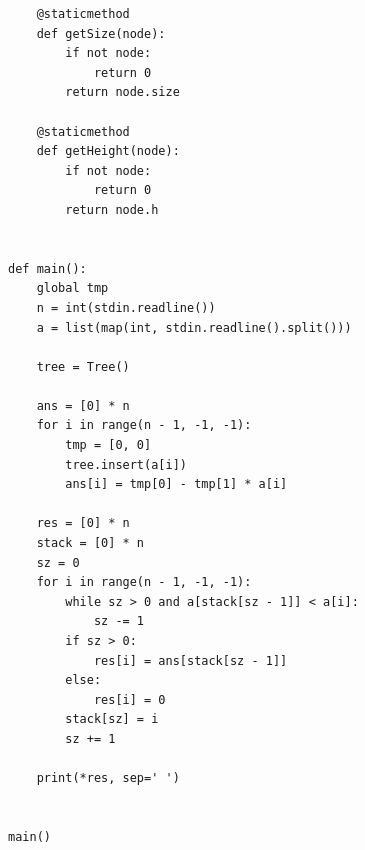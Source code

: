 \begin{latin}
\begin{lstlisting}
    @staticmethod
    def getSize(node):
        if not node:
            return 0
        return node.size

    @staticmethod
    def getHeight(node):
        if not node:
            return 0
        return node.h


def main():
    global tmp
    n = int(stdin.readline())
    a = list(map(int, stdin.readline().split()))

    tree = Tree()

    ans = [0] * n
    for i in range(n - 1, -1, -1):
        tmp = [0, 0]
        tree.insert(a[i])
        ans[i] = tmp[0] - tmp[1] * a[i]

    res = [0] * n
    stack = [0] * n
    sz = 0
    for i in range(n - 1, -1, -1):
        while sz > 0 and a[stack[sz - 1]] < a[i]:
            sz -= 1
        if sz > 0:
            res[i] = ans[stack[sz - 1]]
        else:
            res[i] = 0
        stack[sz] = i
        sz += 1

    print(*res, sep=' ')


main()

\end{lstlisting}
\end{latin}

